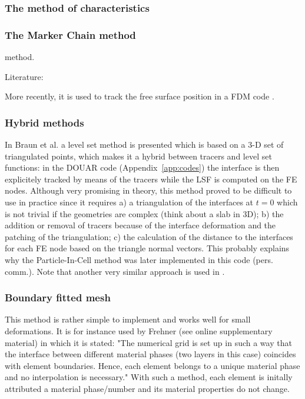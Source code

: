 \subsubsection{The method of characteristics}


\cite{devv00a}

\subsubsection{The Marker Chain method}
 method. 

Literature: \cite{woid78,chri82,chyu84,vaks97}

More recently, it is used to track the free surface position in a FDM code \cite{chmd19}.


\subsubsection{Hybrid methods}

In Braun et al. \cite{brtf08} a level set method is presented which is based on a 3-D set
of triangulated points, which makes it a hybrid between tracers and level set functions:
in the DOUAR code (Appendix~\ref{app:codes}) the interface is then explicitely tracked by means of the tracers while the LSF is computed 
on the FE nodes. Although very promising in theory, this method proved to be difficult to use in practice
since it requires a) a triangulation of the interfaces at $t=0$ which is not trivial if the geometries
are complex (think about a slab in 3D); b) the addition or removal of tracers because of the interface deformation
and the patching of the triangulation; c) the calculation of the distance to the interfaces for each 
FE node based on the triangle normal vectors. 
This probably explains why the Particle-In-Cell method was later implemented in this code (pers. comm.).
Note that another very similar approach is used in \cite{saev10}.



\subsubsection{Boundary fitted mesh}

This method is rather simple to implement and works well for small deformations. It is 
for instance used by Frehner \cite{freh14} (see online supplementary material) in which it is 
stated: "The numerical grid is set up in such a way that the interface
between different material phases (two layers in this case) coincides with element boundaries. Hence, each
element belongs to a unique material phase and no interpolation is necessary."
With such a method, each element is initally attributed a material phase/number and its material
properties do not change. 








